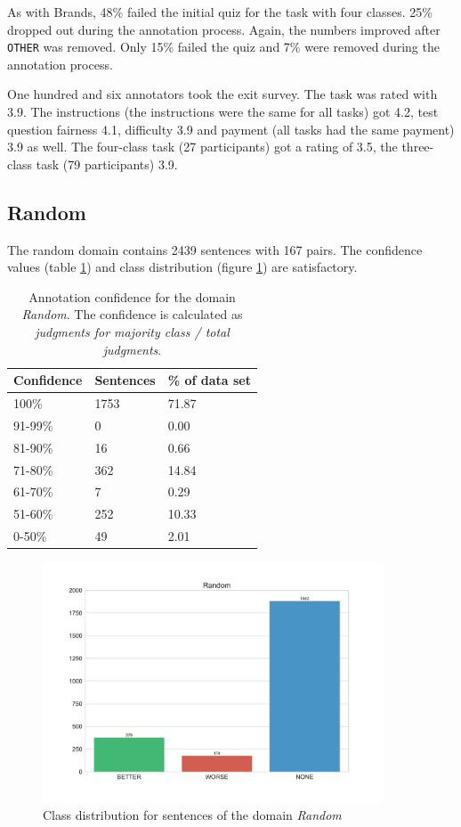 As with Brands, 48\% failed the initial quiz for the task with four classes. 25\% dropped out during the annotation process. Again, the numbers improved after \texttt{OTHER} was removed. Only 15\% failed the quiz and 7\% were removed during the annotation process.

One hundred and six annotators took the exit survey. The task was rated with 3.9. The instructions (the instructions were the same for all tasks) got 4.2, test question fairness 4.1, difficulty 3.9 and payment (all tasks had the same payment) 3.9 as well. The four-class task (27 participants) got a rating of 3.5, the three-class task (79 participants) 3.9.
\subsection{Random}
The random domain contains 2439 sentences with 167 pairs. The confidence values (table \ref{fig:random_agg}) and class distribution (figure \ref{fig:random_fin}) are satisfactory.
\begin{table}[h]
\caption{Annotation confidence for the domain \emph{Random}. The confidence is calculated as \emph{judgments for majority class / total judgments}.}
\label{fig:random_agg}
\begin{tabularx}{\textwidth}{XXX}
\toprule
Confidence & Sentences & \% of data set \\
\midrule
100\%	&	1753	&	71.87	 \\ 
91-99\%	&	0	&	0.00	 \\ 
81-90\%	&	16	&	0.66	 \\ 
71-80\%	&	362	&	14.84	 \\ 
61-70\%	&	7	&	0.29	 \\ 
51-60\%	&	252	&	10.33	 \\ 
0-50\%	&	49	&	2.01	 \\ 
\bottomrule
\end{tabularx}
\end{table}


\begin{figure}[h]
\centering
\caption{Class distribution for sentences of the domain \emph{Random}}
\label{fig:random_fin}
\includegraphics[width=0.9\textwidth]{images/dataset/Random-dist}
\end{figure}


